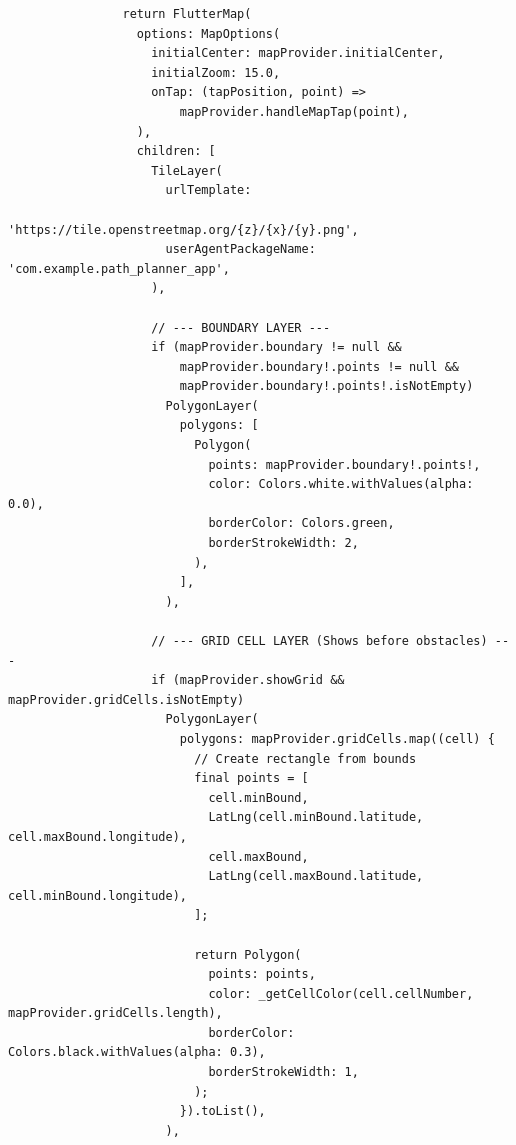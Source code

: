 \begin{lstlisting}
                return FlutterMap(
                  options: MapOptions(
                    initialCenter: mapProvider.initialCenter,
                    initialZoom: 15.0,
                    onTap: (tapPosition, point) =>
                        mapProvider.handleMapTap(point),
                  ),
                  children: [
                    TileLayer(
                      urlTemplate:
                          'https://tile.openstreetmap.org/{z}/{x}/{y}.png',
                      userAgentPackageName: 'com.example.path_planner_app',
                    ),

                    // --- BOUNDARY LAYER ---
                    if (mapProvider.boundary != null &&
                        mapProvider.boundary!.points != null &&
                        mapProvider.boundary!.points!.isNotEmpty)
                      PolygonLayer(
                        polygons: [
                          Polygon(
                            points: mapProvider.boundary!.points!,
                            color: Colors.white.withValues(alpha: 0.0),
                            borderColor: Colors.green,
                            borderStrokeWidth: 2,
                          ),
                        ],
                      ),

                    // --- GRID CELL LAYER (Shows before obstacles) ---
                    if (mapProvider.showGrid && mapProvider.gridCells.isNotEmpty)
                      PolygonLayer(
                        polygons: mapProvider.gridCells.map((cell) {
                          // Create rectangle from bounds
                          final points = [
                            cell.minBound,
                            LatLng(cell.minBound.latitude, cell.maxBound.longitude),
                            cell.maxBound,
                            LatLng(cell.maxBound.latitude, cell.minBound.longitude),
                          ];

                          return Polygon(
                            points: points,
                            color: _getCellColor(cell.cellNumber, mapProvider.gridCells.length),
                            borderColor: Colors.black.withValues(alpha: 0.3),
                            borderStrokeWidth: 1,
                          );
                        }).toList(),
                      ),


\end{lstlisting}
